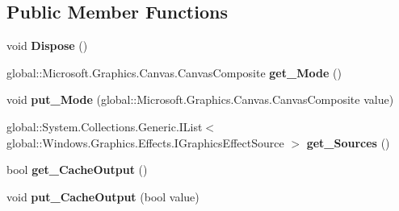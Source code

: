 \subsection*{Public Member Functions}
\begin{DoxyCompactItemize}
\item 
\mbox{\label{class_microsoft_1_1_graphics_1_1_canvas_1_1_effects_1_1_composite_effect_a575ed0bb91f8f9057d8c3afe03a121e5}} 
void {\bfseries Dispose} ()
\item 
\mbox{\label{class_microsoft_1_1_graphics_1_1_canvas_1_1_effects_1_1_composite_effect_a0dfe9fcf616917956fcad2cd37bb9866}} 
global\+::\+Microsoft.\+Graphics.\+Canvas.\+Canvas\+Composite {\bfseries get\+\_\+\+Mode} ()
\item 
\mbox{\label{class_microsoft_1_1_graphics_1_1_canvas_1_1_effects_1_1_composite_effect_ae7ce16aff8d9ed99b8886bff661b4e20}} 
void {\bfseries put\+\_\+\+Mode} (global\+::\+Microsoft.\+Graphics.\+Canvas.\+Canvas\+Composite value)
\item 
\mbox{\label{class_microsoft_1_1_graphics_1_1_canvas_1_1_effects_1_1_composite_effect_a8478bf885b21b246f10dc2bf0558e37c}} 
global\+::\+System.\+Collections.\+Generic.\+I\+List$<$ global\+::\+Windows.\+Graphics.\+Effects.\+I\+Graphics\+Effect\+Source $>$ {\bfseries get\+\_\+\+Sources} ()
\item 
\mbox{\label{class_microsoft_1_1_graphics_1_1_canvas_1_1_effects_1_1_composite_effect_a3c66fe91b91cc425331cdcb4f41beba8}} 
bool {\bfseries get\+\_\+\+Cache\+Output} ()
\item 
\mbox{\label{class_microsoft_1_1_graphics_1_1_canvas_1_1_effects_1_1_composite_effect_a39920fed4de684b9667e7d93c63dbb0c}} 
void {\bfseries put\+\_\+\+Cache\+Output} (bool value)
\item 
\mbox{\label{class_microsoft_1_1_graphics_1_1_canvas_1_1_effects_1_1_composite_effect_ac433461e33a3e94122754d4e470ae2a8}} 

\end{DoxyCompactItemize}
